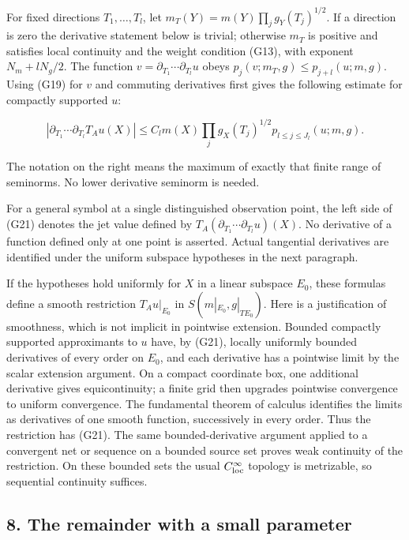 \documentclass[
  11pt,
]{article}
\begin{document}
For fixed directions \(T_1,\ldots,T_l\), let
\(m_T(Y)=m(Y)\prod_jg_Y(T_j)^{1/2}\). If a direction is zero the
derivative statement below is trivial; otherwise \(m_T\) is positive and
satisfies local continuity and the weight condition (G13), with exponent
\(N_m+lN_g/2\). The function \(v=\partial_{T_1}\cdots\partial_{T_l}u\)
obeys \(p_j(v;m_T,g)\leq p_{j+l}(u;m,g)\). Using (G19) for \(v\) and
commuting derivatives first gives the following estimate for compactly
supported \(u\):

\[
|\partial_{T_1}\cdots\partial_{T_l}T_Au(X)|
\leq C_lm(X)\prod_jg_X(T_j)^{1/2}
p_{l\leq j\leq J_l}(u;m,g).                                \tag{G21}
\]

The notation on the right means the maximum of exactly that finite range
of seminorms. No lower derivative seminorm is needed.

For a general symbol at a single distinguished observation point, the
left side of (G21) denotes the jet value defined by
\(T_A(\partial_{T_1}\cdots\partial_{T_l}u)(X)\). No derivative of a
function defined only at one point is asserted. Actual tangential
derivatives are identified under the uniform subspace hypotheses in the
next paragraph.

If the hypotheses hold uniformly for \(X\) in a linear subspace \(E_0\),
these formulas define a smooth restriction \(T_Au|_{E_0}\) in
\(S(m|_{E_0},g|_{TE_0})\). Here is a justification of smoothness, which
is not implicit in pointwise extension. Bounded compactly supported
approximants to \(u\) have, by (G21), locally uniformly bounded
derivatives of every order on \(E_0\), and each derivative has a
pointwise limit by the scalar extension argument. On a compact
coordinate box, one additional derivative gives equicontinuity; a finite
grid then upgrades pointwise convergence to uniform convergence. The
fundamental theorem of calculus identifies the limits as derivatives of
one smooth function, successively in every order. Thus the restriction
has (G21). The same bounded-derivative argument applied to a convergent
net or sequence on a bounded source set proves weak continuity of the
restriction. On these bounded sets the usual \(C^\infty_{\rm loc}\)
topology is metrizable, so sequential continuity suffices.

\subsection{8. The remainder with a small
parameter}\label{the-remainder-with-a-small-parameter}
\end{document}
